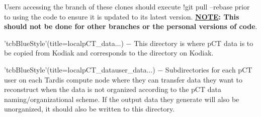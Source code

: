 \begin{tcbfunctionenv}
\begin{tcbparagraph}
Users accessing the  branch of these clones should execute \tcbinlinebashbox!{git pull --rebase} prior to using the code to ensure it is updated to its latest version.  \textbf{\ul{NOTE}: This should not be done for other branches or the personal versions of code}.
\end{tcbparagraph}
\begin{tcbparagraph}'tcbBlueStyle'(title=\dirsep local\dirsep pCT\_data\dirsep$\dots$)
$\boldsymbol{-}$ This directory is where pCT data is to be copied from Kodiak and corresponds to the  directory on Kodiak.
\end{tcbparagraph}
\begin{tcbparagraph}'tcbBlueStyle'(title=\dirsep local\dirsep pCT\_data\dirsep user\_data\dirsep\usernamelabel\dirsep$\dots$)
$\boldsymbol{-}$ Subdirectories for each pCT user on each Tardis compute node where they can transfer data they want to reconstruct when the data is not organized according to the pCT data naming/organizational scheme.  If the output data they generate will also be unorganized, it should also be written to this directory.\\\par


\end{tcbparagraph}
\end{tcbfunctionenv}
